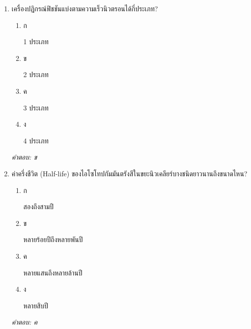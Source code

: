 \documentclass[12pt]{article}
\begin{document}
\begin{enumerate}[label=\arabic*., itemsep=0.5\baselineskip, topsep=0.5\baselineskip, leftmargin=*]
\item เครื่องปฏิกรณ์ฟิชชันแบ่งตามความเร็วนิวตรอนได้กี่ประเภท?
\begin{enumerate}[label=\alph*)., itemsep=0.3\baselineskip, topsep=0.3\baselineskip]
\item ก\ 
\begin{minipage}[t]{0.9\linewidth}
\raggedright 1 ประเภท
\end{minipage}
\item ข\ 
\begin{minipage}[t]{0.9\linewidth}
\raggedright 2 ประเภท
\end{minipage}
\item ค\ 
\begin{minipage}[t]{0.9\linewidth}
\raggedright 3 ประเภท
\end{minipage}
\item ง\ 
\begin{minipage}[t]{0.9\linewidth}
\raggedright 4 ประเภท
\end{minipage}
\end{enumerate}
\vspace{-0.3\baselineskip}
\begin{small}
\textit{คำตอบ: ข}
\end{small}

\item ค่าครึ่งชีวิต (Half-life) ของไอโซโทปกัมมันตรังสีในขยะนิวเคลียร์บางชนิดยาวนานถึงขนาดไหน?
\begin{enumerate}[label=\alph*)., itemsep=0.3\baselineskip, topsep=0.3\baselineskip]
\item ก\ 
\begin{minipage}[t]{0.9\linewidth}
\raggedright สองถึงสามปี
\end{minipage}
\item ข\ 
\begin{minipage}[t]{0.9\linewidth}
\raggedright หลายร้อยปีถึงหลายพันปี
\end{minipage}
\item ค\ 
\begin{minipage}[t]{0.9\linewidth}
\raggedright หลายแสนถึงหลายล้านปี
\end{minipage}
\item ง\ 
\begin{minipage}[t]{0.9\linewidth}
\raggedright หลายสิบปี
\end{minipage}
\end{enumerate}
\vspace{-0.3\baselineskip}
\begin{small}
\textit{คำตอบ: ค}
\end{small}

\end{enumerate}
\end{document}
